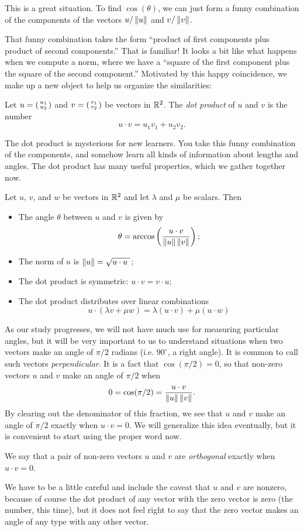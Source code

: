\documentclass[00-livre-main.tex]{subfiles}
\begin{document}
This is a great situation. To find $\cos(\theta)$, we can just form a funny combination of the components of the vectors $u/\left\|u\right\|$ and $v/\left\|v\right\|$. 


That funny combination takes the form ``product of first components plus product of second components.'' That is familiar! It looks a bit like what happens when we compute a norm, where we have a ``square of the first component plus the square of the second component.'' Motivated by this happy coincidence, we make up a new object to help us organize the similarities:
\begin{definition}
Let $u = \left(\begin{smallmatrix} u_1 \\ u_2 \end{smallmatrix}\right)$ and $v = \left(\begin{smallmatrix} v_1 \\ v_2 \end{smallmatrix}\right)$ be vectors in $\mathbb{R}^2$. 
The \emph{dot product} of $u$ and $v$ is the number
\[
u\cdot v = u_1v_1 + u_2v_2 .
\]
\end{definition}

The dot product is mysterious for new learners. You take this funny combination of the components, and somehow learn all kinds of information about lengths and angles. The dot product has many useful properties, which we gather together now.

\begin{theorem}\label{thm:dot-prod-props}
Let $u$, $v$, and $w$ be vectors in $\mathbb{R}^2$ and let $\lambda$ and $\mu$ be scalars. Then
\begin{itemize}
\item The angle $\theta$ between $u$ and $v$ is given by 
\[
\theta = \arccos\left(\frac{u\cdot v}{\left\|u\right\|\left\|v\right\|}\right);
\]
\item The norm of $u$ is $\norm{u} = \sqrt{u\cdot u\ }$;
\item The dot product is symmetric: $u\cdot v = v \cdot u$;
\item The dot product distributes over linear combinations 
\[
u \cdot (\lambda v + \mu w) = \lambda (u\cdot v) + \mu (u\cdot w)
\]
\end{itemize}
\end{theorem}

As our study progresses, we will not have much use for measuring particular angles, but it will be very important to us to understand situations when two vectors make an angle of $\pi/2$ radians (i.e. $90^{\circ}$, a right angle). It is common to call such vectors \emph{perpendicular}. It is a fact that $\cos(\pi/2) = 0$, so that non-zero vectors $u$ and $v$ make an angle of $\pi/2$ when
\[
0 = \cos(\pi/2) = \dfrac{u\cdot v}{\left\|u\right\|\left\|v\right\|}.
\]
By clearing out the denominator of this fraction, we see that $u$ and $v$ make an angle of $\pi/2$ exactly when $u\cdot v = 0$.  We will generalize this idea eventually, but it is convenient to start using the proper word now.
\begin{definition}
We say that a pair of non-zero vectors $u$ and $v$ are \emph{orthogonal} exactly when $u\cdot v=0$.
\end{definition}
We have to be a little careful and include the caveat that $u$ and $v$ are nonzero, because of course the dot product of any vector with the zero vector is zero (the number, this time), but it does not feel right to say that the zero vector makes an angle of any type with any other vector.
\end{document}

